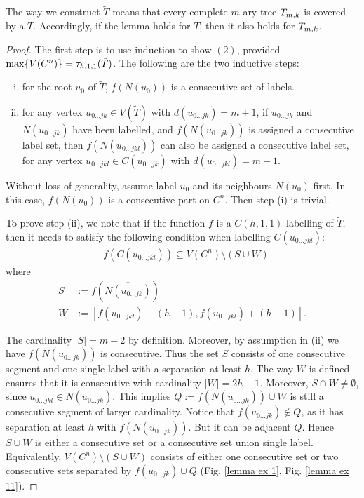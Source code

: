 The way we construct $\tilde{T}$ means that every complete $m$-ary tree $T_{m,k}$ is covered by a $\tilde{T}$. Accordingly, if the lemma holds for $\tilde{T}$, then it also holds for $T_{m,k}$. 
\\
\begin{proof}
The first step is to use induction to show $(2)$, provided $\max\{V(C^n)\} = \tau_{h,1,1}(\tilde{T})$. The following are the two inductive steps: 
\begin{enumerate}[(i)]
\item for the root $u_0$ of $\tilde{T}$, $f(N(u_0))$ is a consecutive set of labels.
\item for any vertex $u_{0\dots jk} \in V(\tilde{T})$ with $d(u_{0\dots jk}) = m+1$, if $u_{0\dots jk}$ and $N(u_{0\dots jk})$ have been labelled, and $f(N(u_{0\dots jk}))$ is assigned a consecutive label set, then $f(N(u_{0\dots jkl}))$ can also be assigned a consecutive label set, for any vertex $u_{0\dots jkl} \in C(u_{0\dots jk})$ with $d(u_{0\dots jkl}) = m+1$. 
\end{enumerate} 

Without loss of generality, assume label $u_0$ and its neighbours $N(u_0)$ first. In this case, $f(N(u_0))$  is a consecutive part on $C^n$. Then step (i) is trivial. 

To prove step (ii), we note that if the function $f$ is a $C(h,1,1)$-labelling of $\tilde{T}$, then it needs to satisfy the following condition when labelling $C(u_{0\dots jkl})$:  
\begin{align}
\label{condition1}
&f(C(u_{0\dots jkl})) \subseteq V(C^n) \setminus (S \cup W)
\end{align}  
where 
\begin{align*}
S &:= f(\overline{N(u_{0\dots jk})}) \\
W &:= [f(u_{0\dots jkl}) - (h-1), f(u_{0\dots jkl}) + (h-1)].
\end{align*}

The cardinality $|S| = m+2$ by definition. Moreover, by assumption in (ii) we have $f(N(u_{0\dots jk}))$ is consecutive. Thus the set $S$ consists of one consecutive segment and one single label with a separation at least $h$. The way $W$ is defined ensures that it is consecutive with cardinality $|W| = 2h-1$. Moreover, $S \cap W \neq \emptyset$, since $u_{0\dots jkl} \in N(u_{0\dots jk})$. This implies $Q:=f(N(u_{0 \dots jk})) \cup W$ is still a consecutive segment of larger cardinality. Notice that $f(u_{0\dots jk}) \not\in Q$, as it has separation at least $h$ with $f(N(u_{0\dots jk}))$. But it can be adjacent $Q$. Hence $S\cup W$ is either a consecutive set or a consecutive set union single label. Equivalently, $V(C^n) \setminus (S \cup W)$ consists of either one consecutive set or two consecutive sets separated by $f(u_{0\dots jk}) \cup Q$ (Fig. \ref{lemma ex 1}, Fig. \ref{lemma ex 11}).


\end{proof}
